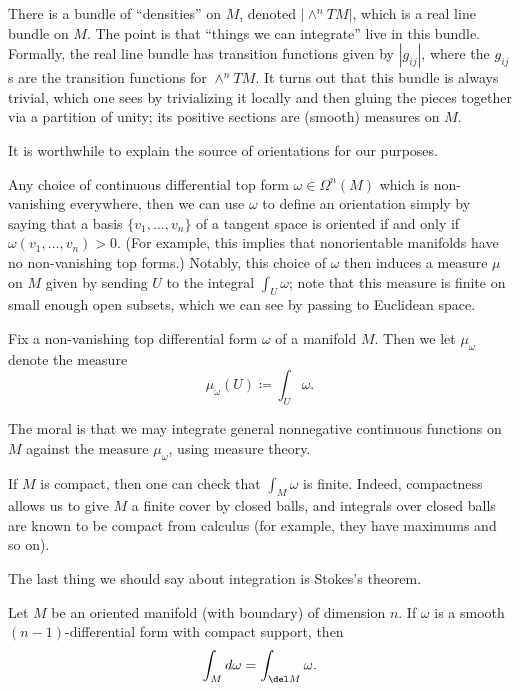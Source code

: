 \documentclass[../notes.tex]{subfiles}
\begin{document}
\begin{remark}
	There is a bundle of ``densities'' on $M$, denoted $\left|\land^nTM\right|$, which is a real line bundle on $M$. The point is that ``things we can integrate'' live in this bundle. Formally, the real line bundle has transition functions given by $\left|g_{ij}\right|$, where the $g_{ij}$s are the transition functions for $\land^nTM$. It turns out that this bundle is always trivial, which one sees by trivializing it locally and then gluing the pieces together via a partition of unity; its positive sections are (smooth) measures on $M$.
\end{remark}
It is worthwhile to explain the source of orientations for our purposes.
\begin{remark} \label{rem:top-form-to-orientation}
	Any choice of continuous differential top form $\omega\in\Omega^n(M)$ which is non-vanishing everywhere, then we can use $\omega$ to define an orientation simply by saying that a basis $\{v_1,\ldots,v_n\}$ of a tangent space is oriented if and only if $\omega(v_1,\ldots,v_n)>0$. (For example, this implies that nonorientable manifolds have no non-vanishing top forms.) Notably, this choice of $\omega$ then induces a measure $\mu$ on $M$ given by sending $U$ to the integral $\int_U\omega$; note that this measure is finite on small enough open subsets, which we can see by passing to Euclidean space.
\end{remark}
\begin{notation}
	Fix a non-vanishing top differential form $\omega$ of a manifold $M$. Then we let $\mu_\omega$ denote the measure
	\[\mu_\omega(U)\coloneqq\int_U\omega.\]
\end{notation}
The moral is that we may integrate general nonnegative continuous functions on $M$ against the measure $\mu_\omega$, using measure theory.
\begin{remark} \label{rem:compact-has-finite-vol}
	If $M$ is compact, then one can check that $\int_M\omega$ is finite. Indeed, compactness allows us to give $M$ a finite cover by closed balls, and integrals over closed balls are known to be compact from calculus (for example, they have maximums and so on).
\end{remark}
The last thing we should say about integration is Stokes's theorem.
\begin{theorem}[Stokes]
	Let $M$ be an oriented manifold (with boundary) of dimension $n$. If $\omega$ is a smooth $(n-1)$-differential form with compact support, then
	\[\int_Md\omega=\int_{\del M}\omega.\]
\end{theorem}
\end{document}
